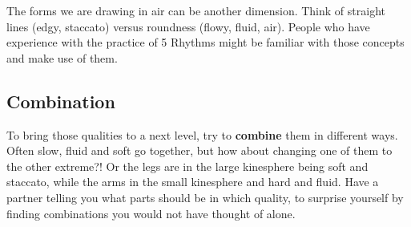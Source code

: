 The forms we are drawing in air can be another dimension.
Think of straight lines (edgy, staccato) versus roundness (flowy, fluid, air).
People who have experience with the practice of 5 Rhythms might be familiar with those concepts and make use of them.

\subsection{Combination}\label{subsec:combination}

To bring those qualities to a next level, try to \textbf{combine} them in different ways.
Often slow, fluid and soft go together, but how about changing one of them to the other extreme?!
Or the legs are in the large kinesphere being soft and staccato, while the arms in the small kinesphere and hard and fluid.
Have a partner telling you what parts should be in which quality, to surprise yourself by finding combinations you would not have thought of alone.
